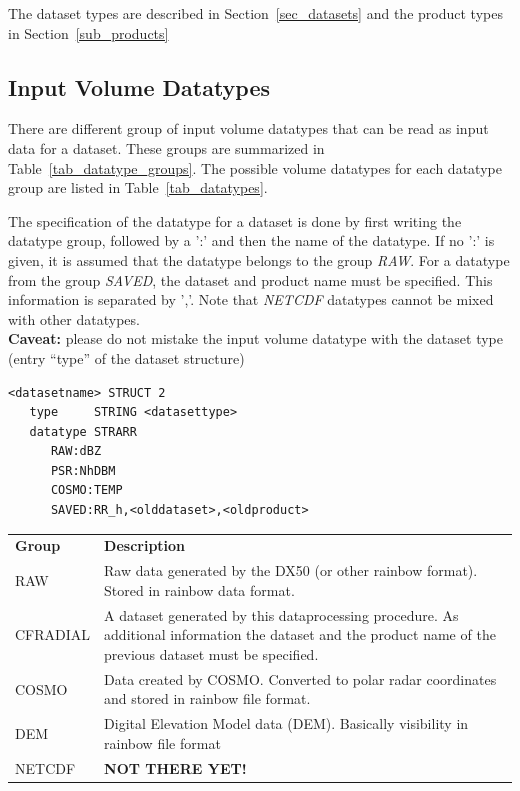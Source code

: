\documentclass[a4paper,11pt,pdftex,twoside]{scrartcl}
\renewcommand{\bf}{\normalfont \bfseries}
\begin{document}
{{{The dataset types are described in Section~\ref{sec_datasets}
and the product types in Section~\ref{sub_products}





\subsection{Input Volume Datatypes}

There are different group of input volume datatypes that can be read as input data
for a dataset. These groups are summarized in Table~\ref{tab_datatype_groups}. The possible volume datatypes for each datatype group are listed in Table~\ref{tab_datatypes}.

The specification of the datatype for a dataset is done by first writing the datatype
group, followed by a ':' and then the name of the datatype. If no ':' is given, it is
assumed that the datatype belongs to the group \emph{RAW}.
For a datatype from the group \emph{SAVED}, the dataset and product name must be
specified. This information is separated by ','.
Note that \emph{NETCDF} datatypes cannot be mixed with other datatypes.\\

\noindent
{\bf Caveat:} please do not mistake the input volume datatype with the dataset type (entry  ``type'' of the dataset structure)
\begin{verbatim}
<datasetname> STRUCT 2
   type     STRING <datasettype>
   datatype STRARR
      RAW:dBZ
      PSR:NhDBM
      COSMO:TEMP
      SAVED:RR_h,<olddataset>,<oldproduct>
\end{verbatim}

\begin{table}[H]
\begin{tabularx}{\textwidth}{lX}
\bf{Group} & \bf{Description}\\
RAW       & Raw data generated by the DX50 (or other rainbow format). Stored in rainbow data format.\\
CFRADIAL     & A dataset generated by this dataprocessing procedure. As additional
            information the dataset and the product name of the previous dataset
            must be specified.\\
COSMO     & Data created by COSMO. Converted to polar radar coordinates and
            stored in rainbow file format.\\
DEM     & Digital Elevation Model data (DEM). Basically visibility in rainbow file format\\
NETCDF    & {\bf NOT THERE YET!} \\


\end{tabularx}
\end{table}}}}
\end{document}
